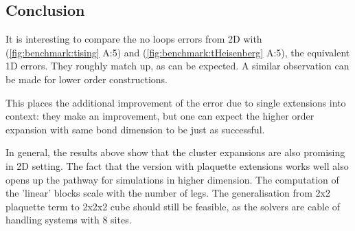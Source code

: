 \subsection{Conclusion}

It is interesting to compare the no loops errors from 2D with (\cref{fig:benchmark:tising} A:5) and (\cref{fig:benchmark:tHeisenberg} A:5), the equivalent 1D errors.  They roughly match up, as can be expected. A similar observation can be made for lower order constructions.

This places the additional improvement of the error due to single extensions into context: they make an improvement, but one can expect the higher order expansion with same bond dimension to be just as successful.

In general, the results above show that the cluster expansions are also promising in 2D setting. The fact that the version with plaquette extensions works well also opens up the pathway for simulations in higher dimension. The computation of the 'linear' blocks scale with the number of legs. The generalisation from 2x2 plaquette term to 2x2x2 cube should still be feasible, as the solvers are cable of handling systems with 8 sites.